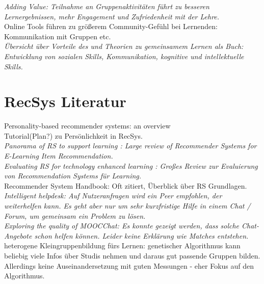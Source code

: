 \documentclass[nochapterpage,bigchapter,linedtoc,longdoc,colorback,accentcolor=tud3b,oneside]{tudreport}
\begin{document}
\textit{Adding Value: Teilnahme an Gruppenaktivitäten führt zu besseren Lernergebnissen, mehr Engagement und Zufriedenheit mit der Lehre. \cite{zhao2004adding}}\\

Online Tools führen zu größerem Community-Gefühl bei Lernenden: Kommunikation mit Gruppen etc. \cite{dawson2006study}\\

\textit{Übersicht über Vorteile des und Theorien zu gemeinsamem Lernen als Buch: \cite{maxwell2008learning} Entwicklung von sozialen Skills, Kommunikation, kognitive und intellektuelle Skills.}

\section{RecSys Literatur}
Personality-based recommender systems: an overview \cite{nunes2012personality}\\
Tutorial(Plan?) zu Persönlichkeit in RecSys.\\

\textit{Panorama of RS to support learning \cite{drachsler2015panorama}: Large review of Recommender Systems for E-Learning Item Recommendation.}\\

\textit{Evaluating RS for technology enhanced learning \cite{erdt2015evaluating}: Großes Review zur Evaluierung von Recommendation Systems für Learning.}\\

Recommender System Handbook: \cite{ricci2011introduction} Oft zitiert, Überblick über RS Grundlagen.\\

\textit{Intelligent helpdesk: Auf Nutzeranfragen wird ein Peer empfohlen, der weiterhelfen kann. Es geht aber nur um sehr kurzfristige Hilfe in einem Chat / Forum, um gemeinsam ein Problem zu lösen. \cite{greer1998intelligent}}\\

\textit{Exploring the quality of MOOCChat: Es konnte gezeigt werden, dass solche Chat-Angebote schon helfen können. Leider keine Erklärung wie Matches entstehen. \cite{reidsema2016exploring}}\\

heterogene Kleingruppenbildung fürs Lernen: genetischer Algorithmus kann beliebig viele Infos über Studis nehmen und daraus gut passende Gruppen bilden. Allerdings keine Auseinandersetzung mit guten Messungen - eher Fokus auf den Algorithmus. \cite{moreno2012genetic}\\
\end{document}
